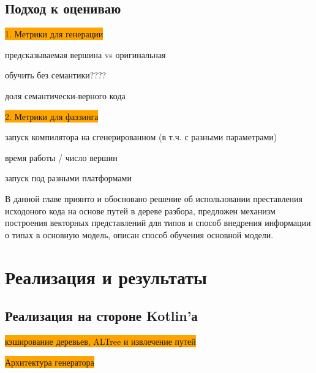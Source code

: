 \documentclass[times,specification,annotation]{itmo-student-thesis}
\begin{document}
\section{Подход к оцениваю}\label{rate}
\colorbox{orange}{1. Метрики для генерации}

предсказываемая вершина vs оригинальная

обучить без семантики????

доля семантически-верного кода

\colorbox{orange}{2. Метрики для фаззинга}

запуск компилятора на сгенерированном (в т.ч. с разными параметрами)

время работы / число вершин

запуск под разными платформами

\chapterconclusion

В данной главе приянто и обосновано решение об использовании преставления исходоного кода на основе путей в дереве разбора, предложен механизм построения векторных представлений для типов и способ внедрения информации о типах в основную модель, описан способ обучения основной модели.


\chapter{Реализация и результаты}

\section{Реализация на стороне Kotlin'а}
\colorbox{orange}{кэширование деревьев, ALTree и извлечение путей}

\colorbox{orange}{Архитектура генератора}
\end{document}
